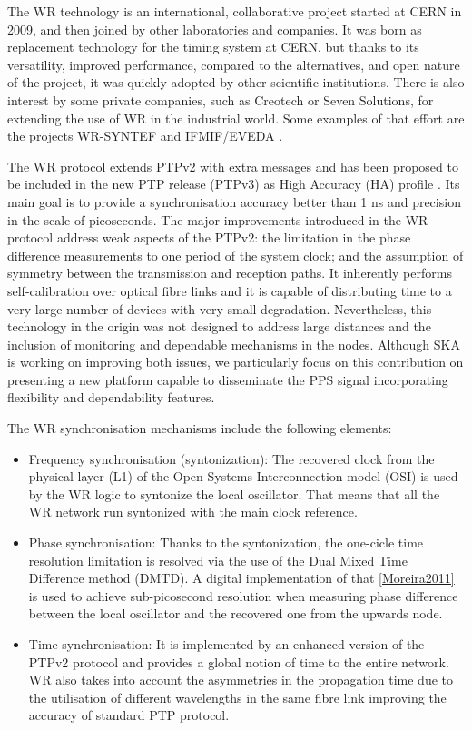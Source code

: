 The WR technology \cite{Wlostowski2011} is an international, collaborative
project started at CERN in 2009, and then joined by other laboratories and
companies. It was born as replacement technology for the timing system at CERN,
but thanks to its versatility, improved performance, compared to the
alternatives, and open nature of the project, it was quickly adopted by other
scientific institutions.  There is also interest by some private companies, 
such as Creotech or Seven Solutions, for extending the use of WR in the 
industrial world. Some examples of that effort are the projects WR-SYNTEF 
\cite{web:creotech_projects} and IFMIF/EVEDA \cite{web:seven_projects}. 

The WR protocol extends PTPv2 with extra messages and has been proposed to be
included in the new PTP release (PTPv3) as High Accuracy (HA) profile
\cite{wr:maciej-ptpv3-standard} . Its main goal is to provide a synchronisation
accuracy better than 1 ns and precision in the scale of picoseconds. The major
improvements introduced in the WR protocol address weak aspects of the PTPv2:
the limitation in the phase difference measurements to one period of the system
clock; and the assumption of symmetry between the transmission and reception
paths. It inherently performs self-calibration over optical fibre links and it
is capable of distributing time to a very large number of devices with very
small degradation. Nevertheless, this technology in the origin was not designed
to address large distances and the inclusion of monitoring and dependable
mechanisms in the nodes. Although SKA is working on improving both issues, we
particularly focus on this contribution on presenting a new platform capable to
disseminate the PPS signal incorporating flexibility and dependability features.  

The WR synchronisation mechanisms include the following elements:

\begin{itemize}
    
\item Frequency synchronisation (syntonization): The recovered clock from the 
physical layer (L1) of the Open Systems Interconnection model (OSI) is used by 
the WR logic to syntonize the local oscillator. That means that all the WR 
network run syntonized with the main clock reference.

\item Phase synchronisation: Thanks to the syntonization, the one-cicle time 
resolution limitation is resolved via the use of the Dual Mixed Time Difference 
method (DMTD). A digital implementation of that \ref{Moreira2011} is used to 
achieve sub-picosecond resolution when measuring phase difference between the 
local oscillator and the recovered one from the upwards node.

\item Time synchronisation: It is implemented by an enhanced version of the 
PTPv2 protocol and provides a global notion of time to the entire network. WR 
also takes into account the asymmetries in the propagation time due to
the utilisation of different wavelengths in the same fibre link improving the 
accuracy of standard PTP protocol. 
\end{itemize}

